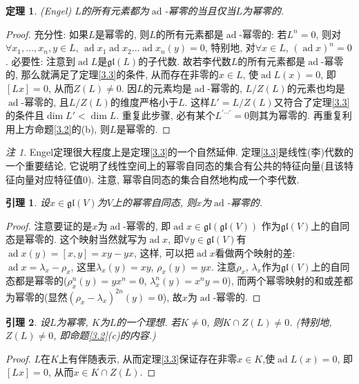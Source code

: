 \documentclass{ctexart}%
\newtheorem{theorem}{定理}
\newtheorem{lemma}{引理}
\theoremstyle{definition}
\theoremstyle{remark}
\newtheorem{remark}{注}
\DeclareMathOperator{\ad}{ad}
\begin{document}
\begin{theorem}(Engel) $L$的所有元素都为$\ad$-幂零的当且仅当$L$为幂零的.
\end{theorem}
\begin{proof}
充分性: 如果$L$是幂零的, 则$L$的所有元素都是$\ad$-幂零的: 若$L^n=0$, 则对$\forall x_1,...,x_n,y\in L$, $\ad x_1 \ad x_2...\ad x_n(y)=0$, 特别地, 对$\forall x\in L$, $(\ad x)^n=0$. 必要性: 注意到$\ad L$是$\mathfrak{gl}(L)$的子代数. 故若李代数$L$的所有元素都是$\ad$-幂零的, 那么就满足了定理\ref{3.3}的条件, 从而存在非零的$x \in L$, 使$\ad L(x)=0$, 即$[Lx]=0$, 从而$Z(L)\neq 0$. 因$L$的元素均是$\ad$-幂零的, $L/Z(L)$的元素也均是$\ad$-幂零的, 且$L/Z(L)$的维度严格小于$L$. 这样$L'=L/Z(L)$又符合了定理\ref{3.3}的条件且$\dim L'<\dim L$. 重复此步骤, 必有某个$L^{'\cdots'}=0$则其为幂零的. 再重复利用上方命题\ref{3.2}的(b), 则$L$是幂零的.
\end{proof}
\begin{remark}
Engel定理很大程度上是定理\ref{3.3}的一个自然延伸. 定理\ref{3.3}是线性(李)代数的一个重要结论, 它说明了线性空间上的幂零自同态的集合有公共的特征向量(且该特征向量对应特征值0). 注意, 幂零自同态的集合自然地构成一个李代数.
\end{remark}


\begin{lemma}
设$x\in \mathfrak{gl}(V)$为$V$上的幂零自同态, 则$x$为$\ad$-幂零的.
\end{lemma}
\begin{proof}
注意要证的是$x$为$\ad$-幂零的, 即$\ad x\in\mathfrak{gl}(\mathfrak{gl}(V))$ 作为$\mathfrak{gl}(V)$上的自同态是幂零的. 这个映射当然就写为$\ad x$, 即$\forall y\in \mathfrak{gl}(V)$有$\ad x(y) =[x,y]=xy-yx$, 这样, 可以把$\ad x$看做两个映射的差: $\ad x= \lambda_x-\rho_x$, 这里$\lambda_x(y)=xy$, $\rho_x(y)=yx$. 注意$\rho_x$, $\lambda_x$作为$\mathfrak{gl}(V)$上的自同态都是幂零的($\rho_x^n(y)=yx^n=0$, $\lambda_x^n(y)=x^ny=0$), 而两个幂零映射的和或差都为幂零的(显然$(\rho_x-\lambda_x)^{2n}(y)=0$), 故$x$为$\ad$-幂零的.
\end{proof}

\begin{lemma}\label{3.3l}
设$L$为幂零, $K$为$L$的一个理想. 若$K\neq 0 $, 则$K\cap Z(L)\neq 0$. (特别地, $Z(L)\neq 0$, 即命题\ref{3.2}(c)的内容.)
\end{lemma}
\begin{proof}
$L$在$K$上有伴随表示, 从而定理\ref{3.3}保证存在非零$x\in K$,使$\ad L(x)=0$, 即$[Lx]=0$, 从而$x\in K\cap Z(L)$.
\end{proof}
\end{document}
